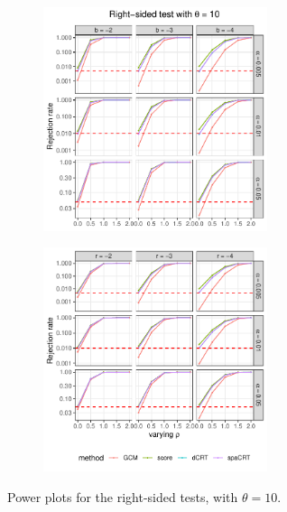 \documentclass[12pt]{article}
\theoremstyle{definition}
\begin{document}
\begin{figure}
  \centering
  \begin{subfigure}{\textwidth}
    \centering
    \includegraphics[width=0.72\textwidth]{figures-and-tables/simulation/power/plot-bin-NB-normal-B-50000-n-5000-5e3-n5-n5-disp-10-power-fixed-gamma-RIGHT.pdf}
  \end{subfigure}

  \begin{subfigure}{\textwidth}
    \centering
    \includegraphics[width=0.72\textwidth]{figures-and-tables/simulation/power/plot-bin-NB-normal-B-50000-n-5000-5e3-n5-n5-disp-10-power-fixed-beta-RIGHT.pdf}
  \end{subfigure}

  \caption{Power plots for the right-sided tests, with $\theta = 10$.}
  \label{fig:simulation-power-RIGHT-10}
\end{figure}
\end{document}
